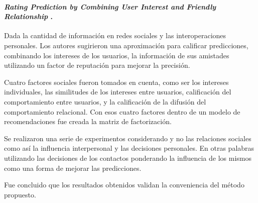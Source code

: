 
\paragraph{
    \textbf{\emph{Rating Prediction by Combining User Interest
    and Friendly Relationship}
    }
    \cite[pág. 167]{somani_emerging_2019}.
}

Dada la cantidad de información en  redes sociales y las interoperaciones personales.
Los autores sugirieron una aproximación para calificar predicciones,
combinando los intereses de los usuarios, la información de sus amistades 
utilizando un factor de reputación para mejorar la precisión.

Cuatro factores sociales fueron tomados en cuenta, como ser los intereses individuales,
las similitudes de los intereses entre usuarios, calificación del comportamiento entre usuarios, 
y la calificación de la difusión del comportamiento relacional. Con esos cuatro factores dentro
de un modelo de recomendaciones fue creada la matriz de factorización. 
 
Se realizaron una serie de experimentos considerando y no las relaciones sociales 
como así la influencia interpersonal y las decisiones personales. 
En otras palabras utilizando las decisiones de los contactos ponderando 
la influencia de los mismos como una forma de mejorar las predicciones.

Fue concluido que los resultados obtenidos validan la conveniencia del método propuesto. 